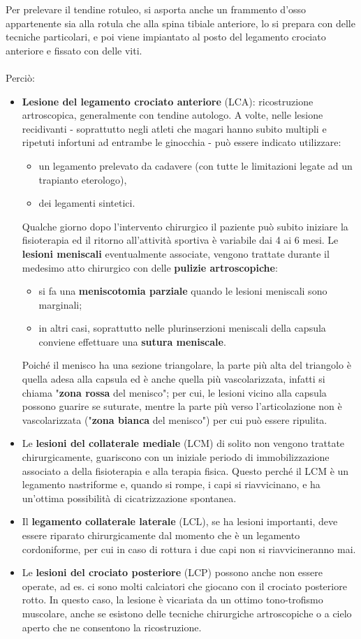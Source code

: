 Per prelevare il tendine rotuleo, si asporta anche un frammento d'osso appartenente sia alla rotula che alla spina tibiale anteriore, lo si prepara con delle tecniche particolari, e poi viene impiantato al posto del legamento crociato anteriore e fissato con delle viti.
\\\\
Perciò:
\begin{itemize}
\item \textbf{Lesione del legamento crociato anteriore} (LCA): ricostruzione artroscopica, generalmente con tendine autologo. A volte, nelle lesione recidivanti - soprattutto negli atleti che magari hanno subito multipli e ripetuti infortuni ad entrambe le ginocchia - può essere indicato utilizzare:
\begin{itemize}
\item un legamento prelevato da cadavere (con tutte le limitazioni legate ad un trapianto eterologo),
\item dei legamenti sintetici.
\end{itemize}
Qualche giorno dopo l'intervento chirurgico il paziente può subito iniziare la fisioterapia ed il ritorno all'attività sportiva è variabile dai 4 ai 6 mesi. Le \textbf{lesioni meniscali} eventualmente associate, vengono trattate durante il medesimo atto chirurgico con delle \textbf{pulizie artroscopiche}:
\begin{itemize}
\item si fa una \textbf{meniscotomia parziale} quando le lesioni meniscali sono marginali;
\item in altri casi, soprattutto nelle plurinserzioni meniscali della capsula conviene effettuare una \textbf{sutura meniscale}.
\end{itemize}
Poiché il menisco ha una sezione triangolare, la parte più alta del triangolo è quella adesa alla capsula ed è anche quella più vascolarizzata, infatti si chiama
"\textbf{zona rossa} del menisco"; per cui, le lesioni vicino alla capsula possono guarire se suturate, mentre la parte più verso l'articolazione non è vascolarizzata ("\textbf{zona bianca} del menisco") per cui può essere ripulita.
\item Le \textbf{lesioni del collaterale mediale} (LCM) di solito non vengono trattate chirurgicamente, guariscono con un iniziale periodo di immobilizzazione associato a della fisioterapia e alla terapia fisica. Questo perché il LCM è un legamento nastriforme e, quando si rompe, i capi si riavvicinano, e ha un'ottima possibilità di cicatrizzazione spontanea.
\item Il \textbf{legamento collaterale laterale} (LCL), se ha lesioni importanti, deve essere riparato chirurgicamente dal momento che è un legamento cordoniforme, per cui in caso di rottura i due capi non si riavvicineranno mai.
\item Le \textbf{lesioni del crociato posteriore} (LCP) possono anche non essere operate, ad es. ci sono molti
calciatori che giocano con il crociato posteriore rotto. In questo caso, la lesione è vicariata da un ottimo tono-trofismo muscolare, anche se esistono delle tecniche chirurgiche artroscopiche o a cielo aperto che ne consentono la ricostruzione.
\end{itemize}

